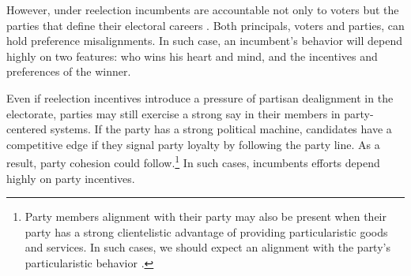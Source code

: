 \documentclass[12pt]{amsart}
\numberwithin{equation}{section}
\theoremstyle{definition}
\theoremstyle{definition}
\theoremstyle{definition}
\begin{document}
However, under reelection incumbents are accountable not only to voters but the parties that define their electoral careers \citep{mayhew_1974,moreno_etal_2003,samuels_shugart_2010, klasnja_titiunik_2017}. Both principals, voters and parties, can hold preference misalignments. In such case, an incumbent's behavior will depend highly on two features: who wins his heart and mind, and the incentives and preferences of the winner. 


Even if reelection incentives introduce a pressure of partisan dealignment in the electorate, parties may still exercise a strong say in their members in party-centered systems. If the party has a strong political machine, candidates have a competitive edge if they signal party loyalty by following the party line. As a result, party cohesion could follow.\footnote{Party members alignment with their party may also be present when their party has a strong clientelistic advantage of providing particularistic goods and services. In such cases, we should expect an alignment with the party's particularistic behavior \citep{fergusson_etal_2018}.} In such cases, incumbents efforts depend highly on party incentives. 
\end{document}
